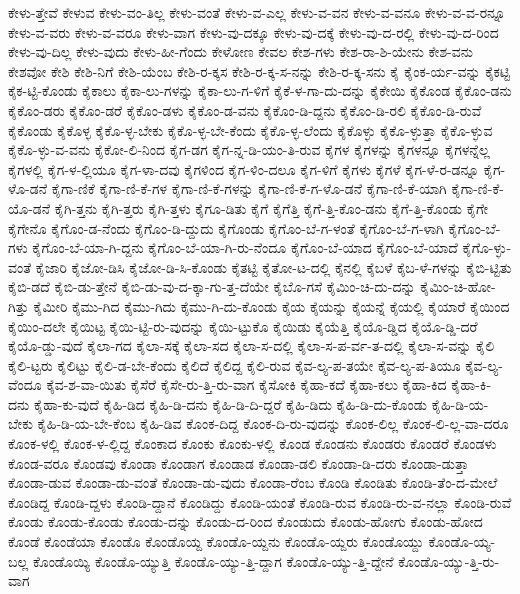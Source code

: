 {ಕೇಳು-ತ್ತೇವೆ
ಕೇಳುವ
ಕೇಳು-ವಂ-ತಿಲ್ಲ
ಕೇಳು-ವಂತೆ
ಕೇಳು-ವ-ಎಲ್ಲ
ಕೇಳು-ವ-ವನ
ಕೇಳು-ವ-ವನೂ
ಕೇಳು-ವ-ವ-ರನ್ನೂ
ಕೇಳು-ವ-ವರು
ಕೇಳು-ವ-ವರೂ
ಕೇಳು-ವಾಗ
ಕೇಳು-ವು-ದಕ್ಕೂ
ಕೇಳು-ವು-ದಕ್ಕೆ
ಕೇಳು-ವು-ದ-ರಲ್ಲಿ
ಕೇಳು-ವು-ದ-ರಿಂದ
ಕೇಳು-ವು-ದಿಲ್ಲ
ಕೇಳು-ವುದು
ಕೇಳು-ಹೀ-ಗೆಂದು
ಕೇಳೋಣ
ಕೇವಲ
ಕೇಶ-ಗಳು
ಕೇಶ-ರಾ-ಶಿ-ಯೇನು
ಕೇಶ-ವನು
ಕೇಶವೋ
ಕೇಶಿ
ಕೇಶಿ-ನಿಗೆ
ಕೇಶಿ-ಯೆಂಬ
ಕೇಶಿ-ರ-ಕ್ಕಸ
ಕೇಶಿ-ರ-ಕ್ಕ-ಸ-ನನ್ನು
ಕೇಶಿ-ರ-ಕ್ಕ-ಸನು
ಕೈ
ಕೈಂಕ-ರ್ಯ-ವನ್ನು
ಕೈಕಟ್ಟಿ
ಕೈಕ-ಟ್ಟಿ-ಕೊಂಡು
ಕೈಕಾಲು
ಕೈಕಾ-ಲು-ಗಳನ್ನು
ಕೈಕಾ-ಲು-ಗ-ಳಿಗೆ
ಕೈಕೆ-ಳ-ಗಾ-ದು-ದನ್ನು
ಕೈಕೇಯಿ
ಕೈಕೊಂಡ
ಕೈಕೊಂ-ಡನು
ಕೈಕೊಂ-ಡರು
ಕೈಕೊಂ-ಡರೆ
ಕೈಕೊಂ-ಡಳು
ಕೈಕೊಂ-ಡ-ವನು
ಕೈಕೊಂ-ಡಿ-ದ್ದನು
ಕೈಕೊಂ-ಡಿ-ರಲಿ
ಕೈಕೊಂ-ಡಿ-ರುವೆ
ಕೈಕೊಂಡು
ಕೈಕೊಳ್ಳ
ಕೈಕೊ-ಳ್ಳ-ಬೇಕು
ಕೈಕೊ-ಳ್ಳ-ಬೇ-ಕೆಂದು
ಕೈಕೊ-ಳ್ಳ-ಲೆಂದು
ಕೈಕೊಳ್ಳು
ಕೈಕೊ-ಳ್ಳುತ್ತಾ
ಕೈಕೊ-ಳ್ಳುವ
ಕೈಕೊ-ಳ್ಳು-ವ-ವನು
ಕೈಕೋ-ಲಿ-ನಿಂದ
ಕೈಗ-ಡಗ
ಕೈಗ-ನ್ನ-ಡಿ-ಯಂ-ತಿ-ರುವ
ಕೈಗಳ
ಕೈಗಳನ್ನು
ಕೈಗಳನ್ನೂ
ಕೈಗಳನ್ನೆಲ್ಲ
ಕೈಗಳಲ್ಲಿ
ಕೈಗ-ಳ-ಲ್ಲಿಯೂ
ಕೈಗ-ಳಾ-ದವು
ಕೈಗಳಿಂದ
ಕೈಗ-ಳಿಂ-ದಲೂ
ಕೈಗ-ಳಿಗೆ
ಕೈಗಳು
ಕೈಗಳೆ
ಕೈಗ-ಳೆ-ರ-ಡನ್ನೂ
ಕೈಗ-ಳೊ-ಡನೆ
ಕೈಗಾ-ಣಿಕೆ
ಕೈಗಾ-ಣಿ-ಕೆ-ಗಳ
ಕೈಗಾ-ಣಿ-ಕೆ-ಗಳನ್ನು
ಕೈಗಾ-ಣಿ-ಕೆ-ಗ-ಳೊ-ಡನೆ
ಕೈಗಾ-ಣಿ-ಕೆ-ಯಾಗಿ
ಕೈಗಾ-ಣಿ-ಕೆ-ಯೊ-ಡನೆ
ಕೈಗಿ-ತ್ತನು
ಕೈಗಿ-ತ್ತರು
ಕೈಗಿ-ತ್ತಳು
ಕೈಗೂ-ಡಿತು
ಕೈಗೆ
ಕೈಗೆತ್ತಿ
ಕೈಗೆ-ತ್ತಿ-ಕೊಂ-ಡನು
ಕೈಗೆ-ತ್ತಿ-ಕೊಂಡು
ಕೈಗೇ
ಕೈಗೇನೊ
ಕೈಗೊಂ-ಡ-ನೆಂದು
ಕೈಗೊಂ-ಡಿ-ದ್ದುದು
ಕೈಗೊಂಡು
ಕೈಗೊಂ-ಬೆ-ಗ-ಳಂತೆ
ಕೈಗೊಂ-ಬೆ-ಗ-ಳಾಗಿ
ಕೈಗೊಂ-ಬೆ-ಗಳು
ಕೈಗೊಂ-ಬೆ-ಯಾ-ಗಿ-ದ್ದನು
ಕೈಗೊಂ-ಬೆ-ಯಾ-ಗಿ-ರು-ನೆಂದೂ
ಕೈಗೊಂ-ಬೆ-ಯಾದ
ಕೈಗೊಂ-ಬೆ-ಯಾದೆ
ಕೈಗೊ-ಳ್ಳು-ವಂತೆ
ಕೈಜಾರಿ
ಕೈಜೋ-ಡಿಸಿ
ಕೈಜೋ-ಡಿ-ಸಿ-ಕೊಂಡು
ಕೈತಟ್ಟಿ
ಕೈತೋ-ಟ-ದಲ್ಲಿ
ಕೈನಲ್ಲಿ
ಕೈಬಳೆ
ಕೈಬ-ಳೆ-ಗಳನ್ನು
ಕೈಬಿ-ಟ್ಟಿತು
ಕೈಬಿ-ಡದೆ
ಕೈಬಿ-ಡು-ತ್ತೇನೆ
ಕೈಬಿ-ಡು-ವು-ದ-ಕ್ಕಾ-ಗು-ತ್ತ-ದೆಯೇ
ಕೈಬೊ-ಗಸೆ
ಕೈಮಿಂ-ಚಿ-ದು-ದನ್ನು
ಕೈಮಿಂ-ಚಿ-ಹೋ-ಗಿತ್ತು
ಕೈಮೀರಿ
ಕೈಮು-ಗಿದ
ಕೈಮು-ಗಿದು
ಕೈಮು-ಗಿ-ದು-ಕೊಂಡು
ಕೈಯ
ಕೈಯನ್ನು
ಕೈಯನ್ನೆ
ಕೈಯಲ್ಲಿ
ಕೈಯಾರೆ
ಕೈಯಿಂದ
ಕೈಯಿಂ-ದಲೇ
ಕೈಯಿಟ್ಟ
ಕೈಯಿ-ಟ್ಟಿ-ರು-ವುದನ್ನು
ಕೈಯಿ-ಟ್ಟುಕೊ
ಕೈಯಿಡು
ಕೈಯೆತ್ತಿ
ಕೈಯೊ-ಡ್ಡಿದ
ಕೈಯೊ-ಡ್ಡಿ-ದರೆ
ಕೈಯೊ-ಡ್ಡು-ವುದೆ
ಕೈಲಾ-ಗದ
ಕೈಲಾ-ಸಕ್ಕೆ
ಕೈಲಾ-ಸದ
ಕೈಲಾ-ಸ-ದಲ್ಲಿ
ಕೈಲಾ-ಸ-ಪ-ರ್ವ-ತ-ದಲ್ಲಿ
ಕೈಲಾ-ಸ-ವನ್ನು
ಕೈಲಿ
ಕೈಲಿ-ಟ್ಟರು
ಕೈಲಿಟ್ಟು
ಕೈಲಿ-ಡ-ಬೇ-ಕೆಂದು
ಕೈಲಿದೆ
ಕೈಲಿದ್ದ
ಕೈಲಿ-ರುವ
ಕೈವ-ಲ್ಯ-ಪ-ತಯೇ
ಕೈವ-ಲ್ಯ-ಪ-ತಿಯೂ
ಕೈವ-ಲ್ಯ-ವೆಂದೂ
ಕೈವ-ಶ-ವಾ-ಯಿತು
ಕೈಸೆರೆ
ಕೈಸೇ-ರು-ತ್ತಿ-ರು-ವಾಗ
ಕೈಸೋಕಿ
ಕೈಹಾ-ಕದೆ
ಕೈಹಾ-ಕಲು
ಕೈಹಾ-ಕಿದ
ಕೈಹಾ-ಕಿ-ದನು
ಕೈಹಾ-ಕು-ವುದೆ
ಕೈಹಿ-ಡಿದ
ಕೈಹಿ-ಡಿ-ದನು
ಕೈಹಿ-ಡಿ-ದಿ-ದ್ದರೆ
ಕೈಹಿ-ಡಿದು
ಕೈಹಿ-ಡಿ-ದು-ಕೊಂಡು
ಕೈಹಿ-ಡಿ-ಯ-ಬೇಕು
ಕೈಹಿ-ಡಿ-ಯ-ಬೇ-ಕೆಂಬ
ಕೈಹಿ-ಡಿವ
ಕೊಂಕ-ದಿದ್ದ
ಕೊಂಕ-ದಿ-ರು-ವುದನ್ನು
ಕೊಂಕ-ಲಿಲ್ಲ
ಕೊಂಕ-ಲಿ-ಲ್ಲ-ವಾ-ದರೂ
ಕೊಂಕ-ಳಲ್ಲಿ
ಕೊಂಕ-ಳ-ಲ್ಲಿದ್ದ
ಕೊಂಕಾದ
ಕೊಂಕು
ಕೊಂಕು-ಳಲ್ಲಿ
ಕೊಂಡ
ಕೊಂಡನು
ಕೊಂಡರು
ಕೊಂಡರೆ
ಕೊಂಡಳು
ಕೊಂಡ-ವರೂ
ಕೊಂಡವು
ಕೊಂಡಾ
ಕೊಂಡಾಗ
ಕೊಂಡಾಡ
ಕೊಂಡಾ-ಡಲಿ
ಕೊಂಡಾ-ಡಿ-ದರು
ಕೊಂಡಾ-ಡುತ್ತಾ
ಕೊಂಡಾ-ಡುವ
ಕೊಂಡಾ-ಡು-ವಂತೆ
ಕೊಂಡಾ-ಡು-ವುದು
ಕೊಂಡಾ-ರೆಂಬ
ಕೊಂಡಿ
ಕೊಂಡಿತು
ಕೊಂಡಿ-ತೆಂ-ದ-ಮೇಲೆ
ಕೊಂಡಿದ್ದ
ಕೊಂಡಿ-ದ್ದಳು
ಕೊಂಡಿ-ದ್ದಾನೆ
ಕೊಂಡಿದ್ದು
ಕೊಂಡಿ-ಯಂತೆ
ಕೊಂಡಿ-ರುವ
ಕೊಂಡಿ-ರು-ವ-ನಲ್ಲಾ
ಕೊಂಡಿ-ರುವೆ
ಕೊಂಡು
ಕೊಂಡು-ಕೊಂಡು
ಕೊಂಡು-ದನ್ನು
ಕೊಂಡು-ದ-ರಿಂದ
ಕೊಂಡುದು
ಕೊಂಡು-ಹೋಗು
ಕೊಂಡು-ಹೋದ
ಕೊಂಡೆ
ಕೊಂಡೆಯಾ
ಕೊಂಡೊ
ಕೊಂಡೊಯ್ದ
ಕೊಂಡೊ-ಯ್ದನು
ಕೊಂಡೊ-ಯ್ದರು
ಕೊಂಡೊಯ್ದು
ಕೊಂಡೊ-ಯ್ಯ-ಬಲ್ಲ
ಕೊಂಡೊಯ್ಯಿ
ಕೊಂಡೊ-ಯ್ಯುತ್ತಿ
ಕೊಂಡೊ-ಯ್ಯು-ತ್ತಿ-ದ್ದಾಗ
ಕೊಂಡೊ-ಯ್ಯು-ತ್ತಿ-ದ್ದೇನೆ
ಕೊಂಡೊ-ಯ್ಯು-ತ್ತಿ-ರು-ವಾಗ
}
